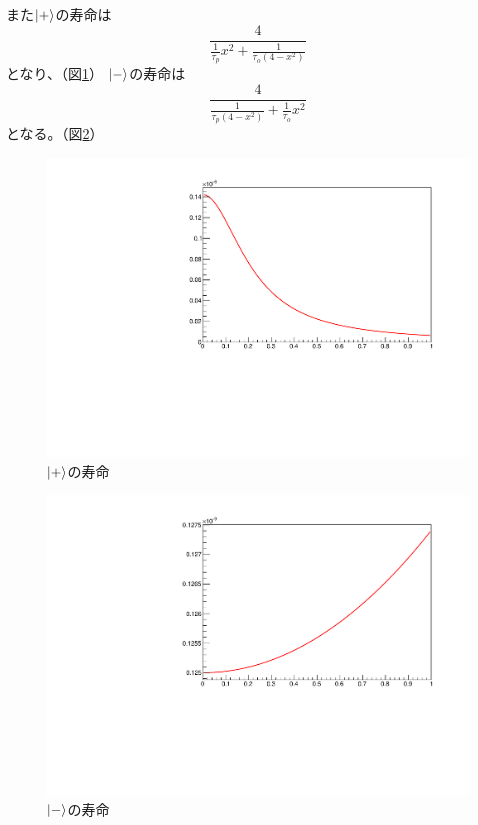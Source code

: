 また$\ket{+}$の寿命は
\begin{equation}
	\nonumber
\frac{4}{\frac{1}{\tau_{p}}x^{2}+\frac{1}{\tau_{o}(4-x^{2})}}
\end{equation}
となり、（図\ref{fig:pluslife}）
$\ket{-}$の寿命は
\begin{equation}
	\nonumber
\frac{4}{\frac{1}{\tau_{p}(4-x^{2})}+\frac{1}{\tau_{o}}x^{2}}
\end{equation}
となる。（図\ref{fig:minuslife}）

\begin{figure}[H]
\centering
\includegraphics[keepaspectratio,angle=270,scale=0.6]{fig/ybm/pluslife.pdf}
\caption{$\ket{+}$の寿命}
\label{fig:pluslife}
\end{figure}

\begin{figure}[H]
\centering
\includegraphics[keepaspectratio,angle=270,scale=0.6]{fig/ybm/minuslife.pdf}
\caption{$\ket{-}$の寿命}
\label{fig:minuslife}
\end{figure}


